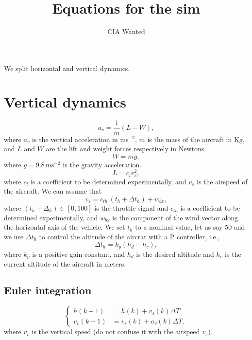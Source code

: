 \documentclass[11pt,a4paper,titlepage]{article}
\title{Equations for the sim}
\author{CIA Wanted}
\begin{document}
\maketitle
We split horizontal and vertical dynamics.

\section{Vertical dynamics}
\begin{equation}
	a_v = \frac{1}{m} (L - W),
\end{equation}
where $a_v$ is the vertical acceleration in ms$^{-2}$, $m$ is the mass of the aircraft in Kg, and $L$ and $W$ are the lift and weight forces respectively in Newtons.
\begin{equation}
W = mg,
\end{equation}
where $g = 9.8 \, \text{ms}^{-2}$ is the gravity acceleration.
\begin{equation}
L = c_l v_s^2,
\end{equation}
where $c_l$ is a coefficient to be determined experimentally, and $v_s$ is the airspeed of the aircraft. We can assume that
\begin{equation}
	v_s = c_{th}\, (t_h + \Delta t_h) + w_{bx},
\end{equation}
where $(t_h + \Delta_h) \in [0,100]$ is the throttle signal and $c_{th}$ is a coefficient to be determined experimentally, and $w_{bx}$ is the component of the wind vector along the horizontal axis of the vehicle. We set $t_h$ to a nominal value, let us say $50$ and we use $\Delta t_h$ to control the altitude of the aircrat with a P controller, i.e., 
\begin{equation}
	\Delta t_h = k_p (h_d - h_c),
\end{equation}
where $k_p$ is a positive gain constant, and $h_d$ is the desired altitude and $h_c$ is the current altitude of the aircraft in meters.

\subsection{Euler integration}
\begin{equation}
	\begin{cases}
		h(k+1) &= h(k) + v_s(k) \Delta T \\
		v_v(k+1) &= v_s(k) + a_v(k) \Delta T,
	\end{cases}
\end{equation}
where $v_v$ is the vertical speed (do not confuse it with the airspeed $v_s$).
\end{document}
